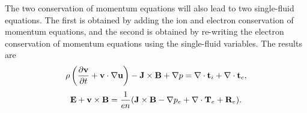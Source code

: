 \documentclass[oneside,a4paper,11pt]{report}
\begin{document}
The two conservation of momentum equations will also lead to two single-fluid equations. The first is obtained by adding the ion and electron conservation of momentum equations, and the second is obtained by re-writing the electron conservation of momentum equations using the single-fluid variables. The results are
\begin{equation}
\label{eq:generalized_MHD_vel}
    \rho \left (\frac{\partial \mathbf{v}}{\partial t} + \mathbf{v} \cdot \nabla \mathbf{u} \right) - \mathbf{J} \times \mathbf{B} + \nabla p = \nabla \cdot \mathbf{t}_i + \nabla \cdot \mathbf{t}_e,
\end{equation}
\begin{equation}
\label{eq:generalized_MHD_ohms}
    \mathbf{E} + \mathbf{v} \times \mathbf{B} = \frac{1}{en} ( \mathbf{J} \times \mathbf{B} - \nabla p_e + \nabla \cdot \mathbf{T}_e + \mathbf{R}_e).
\end{equation}
\end{document}
